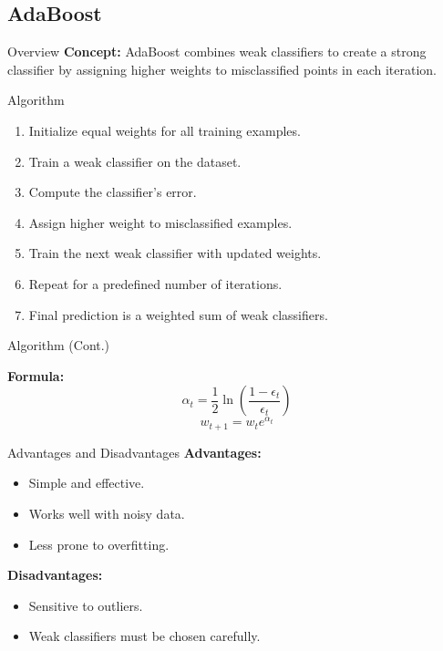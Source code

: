 \documentclass[serif, aspectratio=169]{beamer}
\begin{document}
\subsection{AdaBoost}

\begin{frame}{Overview}
\textbf{Concept:} AdaBoost combines weak classifiers to create a strong classifier by assigning higher weights to misclassified points in each iteration.
\end{frame}
\begin{frame}{Algorithm}
\begin{enumerate}
    \item Initialize equal weights for all training examples.
    \item Train a weak classifier on the dataset.
    \item Compute the classifier's error.
    \item Assign higher weight to misclassified examples.
    \item Train the next weak classifier with updated weights.
    \item Repeat for a predefined number of iterations.
    \item Final prediction is a weighted sum of weak classifiers.
\end{enumerate}
\end{frame}

\begin{frame}{Algorithm (Cont.)}
    
\textbf{Formula:}
\begin{equation}
    \alpha_t = \frac{1}{2} \ln \left( \frac{1 - \epsilon_t}{\epsilon_t} \right)
\end{equation}
\begin{equation}
    w_{t+1} = w_t e^{\alpha_t}
\end{equation}
\end{frame}
\begin{frame}{Advantages and Disadvantages}
\textbf{Advantages:}
\begin{itemize}
    \item Simple and effective.
    \item Works well with noisy data.
    \item Less prone to overfitting.
\end{itemize}

\textbf{Disadvantages:}
\begin{itemize}
    \item Sensitive to outliers.
    \item Weak classifiers must be chosen carefully.
\end{itemize}
\end{frame}
\end{document}
